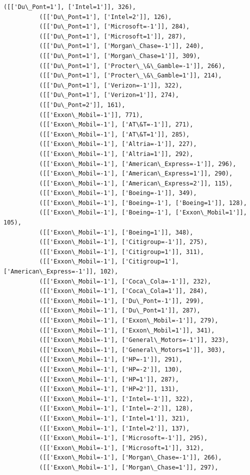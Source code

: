 \documentclass[11pt]{article}
\begin{document}
\begin{Verbatim}[commandchars=\\\{\}]
          ([['Du\_Pont=1'], ['Intel=1']], 326),
          ([['Du\_Pont=1'], ['Intel=2']], 126),
          ([['Du\_Pont=1'], ['Microsoft=-1']], 284),
          ([['Du\_Pont=1'], ['Microsoft=1']], 287),
          ([['Du\_Pont=1'], ['Morgan\_Chase=-1']], 240),
          ([['Du\_Pont=1'], ['Morgan\_Chase=1']], 309),
          ([['Du\_Pont=1'], ['Procter\_\&\_Gamble=-1']], 266),
          ([['Du\_Pont=1'], ['Procter\_\&\_Gamble=1']], 214),
          ([['Du\_Pont=1'], ['Verizon=-1']], 322),
          ([['Du\_Pont=1'], ['Verizon=1']], 274),
          ([['Du\_Pont=2']], 161),
          ([['Exxon\_Mobil=-1']], 771),
          ([['Exxon\_Mobil=-1'], ['AT\&T=-1']], 271),
          ([['Exxon\_Mobil=-1'], ['AT\&T=1']], 285),
          ([['Exxon\_Mobil=-1'], ['Altria=-1']], 227),
          ([['Exxon\_Mobil=-1'], ['Altria=1']], 292),
          ([['Exxon\_Mobil=-1'], ['American\_Express=-1']], 296),
          ([['Exxon\_Mobil=-1'], ['American\_Express=1']], 290),
          ([['Exxon\_Mobil=-1'], ['American\_Express=2']], 115),
          ([['Exxon\_Mobil=-1'], ['Boeing=-1']], 349),
          ([['Exxon\_Mobil=-1'], ['Boeing=-1'], ['Boeing=1']], 128),
          ([['Exxon\_Mobil=-1'], ['Boeing=-1'], ['Exxon\_Mobil=1']], 105),
          ([['Exxon\_Mobil=-1'], ['Boeing=1']], 348),
          ([['Exxon\_Mobil=-1'], ['Citigroup=-1']], 275),
          ([['Exxon\_Mobil=-1'], ['Citigroup=1']], 311),
          ([['Exxon\_Mobil=-1'], ['Citigroup=1'], ['American\_Express=-1']], 102),
          ([['Exxon\_Mobil=-1'], ['Coca\_Cola=-1']], 232),
          ([['Exxon\_Mobil=-1'], ['Coca\_Cola=1']], 284),
          ([['Exxon\_Mobil=-1'], ['Du\_Pont=-1']], 299),
          ([['Exxon\_Mobil=-1'], ['Du\_Pont=1']], 287),
          ([['Exxon\_Mobil=-1'], ['Exxon\_Mobil=-1']], 279),
          ([['Exxon\_Mobil=-1'], ['Exxon\_Mobil=1']], 341),
          ([['Exxon\_Mobil=-1'], ['General\_Motors=-1']], 323),
          ([['Exxon\_Mobil=-1'], ['General\_Motors=1']], 303),
          ([['Exxon\_Mobil=-1'], ['HP=-1']], 291),
          ([['Exxon\_Mobil=-1'], ['HP=-2']], 130),
          ([['Exxon\_Mobil=-1'], ['HP=1']], 287),
          ([['Exxon\_Mobil=-1'], ['HP=2']], 131),
          ([['Exxon\_Mobil=-1'], ['Intel=-1']], 322),
          ([['Exxon\_Mobil=-1'], ['Intel=-2']], 128),
          ([['Exxon\_Mobil=-1'], ['Intel=1']], 321),
          ([['Exxon\_Mobil=-1'], ['Intel=2']], 137),
          ([['Exxon\_Mobil=-1'], ['Microsoft=-1']], 295),
          ([['Exxon\_Mobil=-1'], ['Microsoft=1']], 312),
          ([['Exxon\_Mobil=-1'], ['Morgan\_Chase=-1']], 266),
          ([['Exxon\_Mobil=-1'], ['Morgan\_Chase=1']], 297),

\end{Verbatim}
\end{document}
